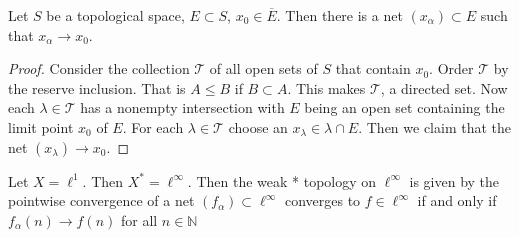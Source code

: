 \begin{example}
  Let $S$ be a topological space, $E \subset S$, $x_0 \in
  \overline{E}$. Then there is a net $(x_\alpha) \subset E$ such that
  $x_\alpha \to x_0$.
\end{example}
\begin{proof}
  Consider the collection $\mathscr{T}$ of all open sets of $S$ that
  contain $x_0$. Order $\mathscr{T}$ by the reserve inclusion. That
  is $A \le B$ if $B \subset A$. This makes $\mathscr{T}$, a directed
  set. Now each $ \lambda \in \mathscr{T}$ has a nonempty
  intersection with $E$ being an open set containing the limit point
  $x_0$ of $E$. For each $\lambda \in \mathscr{T}$ choose an
  $x_\lambda \in \lambda\cap E$. Then we claim that the net
  $(x_\lambda) \to x_0$.
\end{proof}

\begin{example}
  Let $X = \ell^{1}$. Then $X^{*} = \ell^{\infty}$. Then the weak *
  topology on $\ell^{\infty}$ is given by the pointwise convergence
  of a net $(f_\alpha) \subset \ell^{\infty}$ converges to $f \in
  \ell^{\infty}$ if and only if $f_\alpha(n) \to f(n)$ for all $ n
  \in \mathbb{N}$
\end{example}

